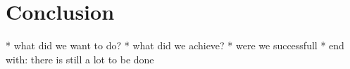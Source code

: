 \section{Conclusion}
\label{sec:conclusion}


* what did we want to do?
* what did we achieve?
* were we successfull
* end with: there is still a lot to be done
